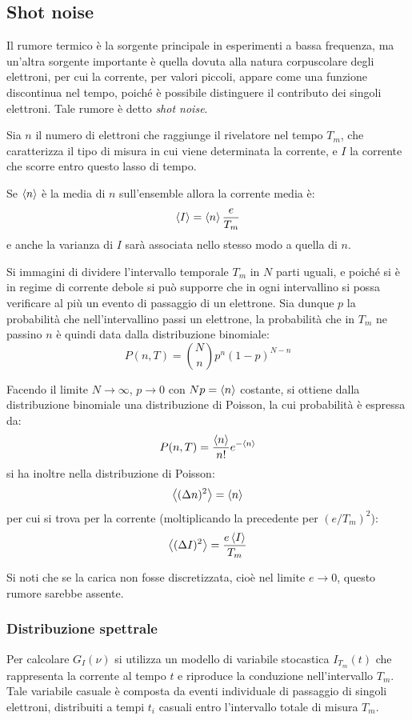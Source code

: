 \subsection{Shot noise}

Il rumore termico è la sorgente principale in esperimenti a bassa frequenza, ma un'altra sorgente importante è quella dovuta alla natura corpuscolare degli elettroni, per cui la corrente, per valori piccoli, appare come una funzione discontinua nel tempo, poiché è possibile distinguere il contributo dei singoli elettroni. Tale rumore è detto \textit{shot noise}.

Sia $ n $ il numero di elettroni che raggiunge il rivelatore nel tempo $ T_m $, che caratterizza il tipo di misura in cui viene determinata la corrente, e $ I $ la corrente che scorre entro questo lasso di tempo.

Se $ \expval{n} $ è la media di $ n $ sull'ensemble allora la corrente media è:
\[ \expval{I} = \expval{n} \frac{e}{T_m} \]
e anche la varianza di $ I $ sarà associata nello stesso modo a quella di $ n $.

Si immagini di dividere l'intervallo temporale $ T_m $ in $ N $ parti uguali, e poiché si è in regime di corrente debole si può supporre che in ogni intervallino si possa verificare al più un evento di passaggio di un elettrone.
Sia dunque $ p $ la probabilità che nell'intervallino passi un elettrone, la probabilità che in $ T_m $ ne passino $ n $ è quindi data dalla distribuzione binomiale:
\[ P(n, T) = \binom{N}{n} p^n (1-p)^{N-n} \]

Facendo il limite $ N \rightarrow \infty $, $ p \rightarrow 0 $ con $ Np = \expval{n} $ costante, si ottiene dalla distribuzione binomiale una distribuzione di Poisson, la cui probabilità è espressa da:
\[ P(n,T) = \frac{\expval{n}}{n!} e^{-\expval{n}} \]
si ha inoltre nella distribuzione di Poisson:
\[ \expval{(\Delta n)^2} = \expval{n} \]
per cui si trova per la corrente (moltiplicando la precedente per $ (e/T_m)^2 $):
\[ \expval{(\Delta I)^2} = \frac{e\expval{I}}{T_m} \]

Si noti che se la carica non fosse discretizzata, cioè nel limite $ e \rightarrow 0 $, questo rumore sarebbe assente.

\subsubsection{Distribuzione spettrale}

Per calcolare $ G_I(\nu) $ si utilizza un modello di variabile stocastica $ I_{T_m}(t) $ che rappresenta la corrente al tempo $ t $ e riproduce la conduzione nell'intervallo $ T_m $. Tale variabile casuale è composta da eventi individuale di passaggio di singoli elettroni, distribuiti a tempi $ t_i $ casuali entro l'intervallo totale di misura $ T_m $.

